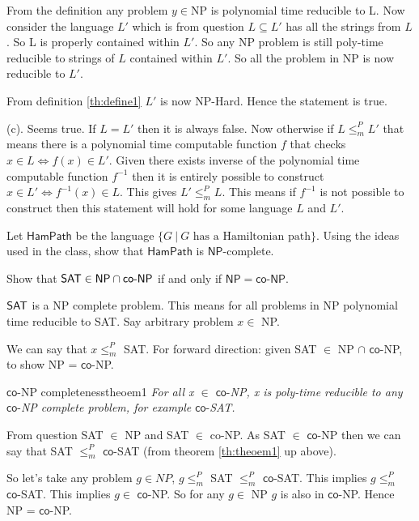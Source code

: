 \documentclass[12pt,a4, onecolumn]{exam}
\newcommand{\hamp}{\ensuremath{\mathsf{HamPath}}}
\newcommand{\NP}{\ensuremath{\mathsf{NP}}}
\newcommand{\co}{\ensuremath{\mathsf{co}\mbox{-}}}
\begin{document}
\begin{questions}
\begin{solution}
        From the definition any problem $y \in \text{NP}$ is polynomial time reducible to L. Now consider the language $L'$ which is from question $L \subseteq L'$ has all the strings from $L$. So L is properly contained within $L'$. So any NP problem is still poly-time reducible to strings of $L$ contained within $L'$. So all the problem in NP is now reducible to $L'$.

        From definition \ref{th:define1} $L'$ is now NP-Hard. Hence the statement is true.

        (c). Seems true. If $L = L'$ then it is always false. Now otherwise if $L \le_{m}^P L'$ that means there is a polynomial time computable function $f$ that checks $x \in L \iff f(x) \in L'$. Given there exists inverse of the polynomial time computable function $f^{-1}$ then it is entirely possible to construct $x \in L' \iff f^{-1}(x) \in L$. This gives $L' \le_{m}^P L$. This means if $f^{-1}$ is not possible to construct then this statement will hold for some language $L$ and $L'$.
    \end{solution}
    
    \question Let $\hamp$ be the  language $\{G~|~ G \mbox{ has a Hamiltonian path}\}$.  Using the ideas used in the class, show that $\hamp$ is $\NP$-complete.
    \newpage

    

    \question Show that  ${\sf SAT}\in \NP\cap\co\NP$ if and only if  $\NP=\co\NP$.

    \begin{solution}
        ${\sf SAT}$ is a NP complete problem. This means for all problems in NP polynomial time reducible to SAT. Say arbitrary problem $x \in$ NP.
    
        We can say that $x \leq_{m} ^P$ SAT. For forward direction: given SAT $\in$ NP $\cap$ $\co$NP, to show NP = $\co$NP.

        \begin{theo}{$\co$NP completeness}{theoem1}
          \textit{For all x $\in$ $\co$NP, x is poly-time reducible to any $\co$NP complete problem, for example $\co$SAT.}
        \end{theo}
        
        From question SAT $\in$ NP and SAT $\in$ co-NP. As SAT $\in$ $\co$NP then we can say that SAT $\leq_{m} ^P$ $\co$SAT (from theorem \ref{th:theoem1} up above).

        So let's take any problem $g \in NP$, $g \leq_{m} ^P$ SAT $\leq_{m} ^P$ $\co$SAT. This implies $g \leq_{m} ^P$ $\co$SAT. This implies $g \in$ $\co$NP. So for any $g \in$ NP $g$ is also in $\co$NP. Hence NP = $\co$NP.


\end{solution}
\end{questions}
\end{document}
